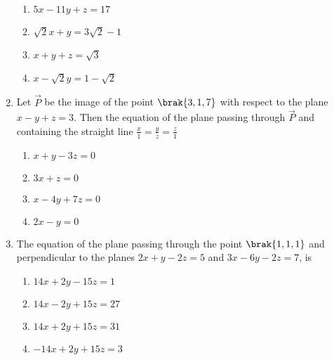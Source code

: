 \begin{enumerate}
\begin{enumerate}
        \item $5x-11y+z=17$           
	\item $\sqrt{2}x+y=3\sqrt{2}-1$                   
	\item $x+y+z=\sqrt{3}$           
	\item $x-\sqrt{2}y=1-\sqrt{2}$\\ 
\end{enumerate}
         \item %
		 Let $\vec{P}$ be the image of the point $\brak{3,1,7}$ with respect to the plane $x-y+z=3$. Then the equation of the plane passing through $\vec{P}$ and containing the straight line $\frac{x}{1}=\frac{y}{z}=\frac{z}{1}$ \hfill{}\\
\begin{enumerate}
        \item $x+y-3z=0$                             
        \item $3x+z=0$                           
        \item $x-4y+7z=0$            
        \item $2x-y=0$\\          
\end{enumerate}

         \item %
		 The equation of the plane passing through the point $\brak{1,1,1}$ and perpendicular to the planes $2x+y-2z=5$ and $3x-6y-2z=7$, is \hfill{}\\
\begin{enumerate}
        \item $14x+2y-15z=1$                             
        \item $14x-2y+15z=27$                           
        \item $14x+2y+15z=31$            
        \item $-14x+2y+15z=3$\\          
\end{enumerate}

\end{enumerate}
